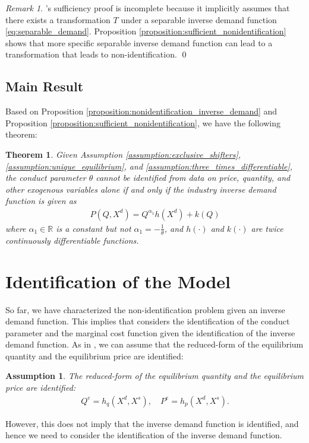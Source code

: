 \documentclass[11pt, a4paper]{article}
\newtheorem{theorem}{Theorem}
\newtheorem{assumption}{Assumption}
\theoremstyle{remark}
\newtheorem{remark}{Remark}
\begin{document}
\begin{remark}
    \citet{lau1982identifying}'s sufficiency proof is incomplete because it implicitly assumes that there exists a transformation $T$ under a separable inverse demand function \eqref{eq:separable_demand}.
    Proposition \ref{proposition:sufficient_nonidentification} shows that more specific separable inverse demand function can lead to a transformation that leads to non-identification. \qed
\end{remark}




\subsection{Main Result}

Based on Proposition \ref{proposition:nonidentification_inverse_demand} and Proposition \ref{proposition:sufficient_nonidentification}, we have the following theorem:
\begin{theorem}\label{theorem:identification_characterization}
    Given Assumption \ref{assumption:exclusive_shifters}, \ref{assumption:unique_equilibrium}, and \ref{assumption:three_times_differentiable}, the conduct parameter $\theta$ cannot be identified from data on price, quantity, and other exogenous variables alone if and only if the industry inverse demand function is given as
    \begin{align}
        P(Q, X^{d}) = Q^{\alpha_1}h(X^{d}) + k(Q)
    \end{align}
    where $\alpha_1 \in \mathbb{R}$ is a constant but not $\alpha_1 = -\frac{1}{\theta}$, and $h(\cdot)$ and $k(\cdot)$ are twice continuously differentiable functions.
\end{theorem}


\section{Identification of the Model}

So far, we have characterized the non-identification problem given an inverse demand function.
This implies that \citet{lau1982identifying} considers the identification of the conduct parameter and the marginal cost function given the identification of the inverse demand function.
As in \citet{lau1982identifying}, we can assume that the reduced-form of the equilibrium quantity and the equilibrium price are identified:

\begin{assumption}
    The reduced-form of the equilibrium quantity and the equilibrium price are identified:
    \begin{align}
        Q^e = h_q(X^{d}, X^{s}), \quad P^e = h_p(X^{d}, X^{s}).
    \end{align}
\end{assumption}
However, this does not imply that the inverse demand function is identified, and hence we need to consider the identification of the inverse demand function.
\end{document}
